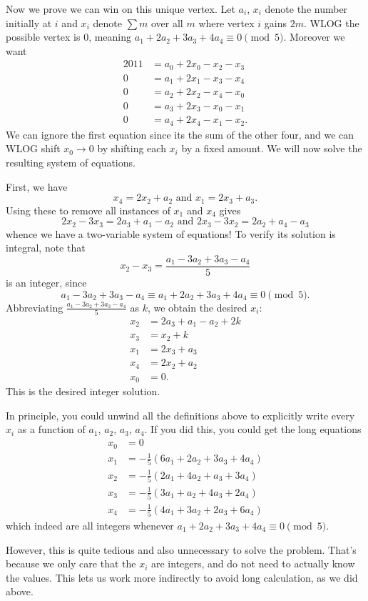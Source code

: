 \documentclass[11pt]{scrartcl}
\begin{document}
Now we prove we can win on this unique vertex.
Let $a_i$, $x_i$ denote the number initially at $i$
and $x_i$ denote $\sum m$ over all $m$ where vertex $i$ gains $2m$.
WLOG the possible vertex is $0$,
meaning $a_1 + 2a_2 + 3a_3 + 4a_4 \equiv 0 \pmod 5$.
Moreover we want
\begin{align*}
  2011 &= a_0 + 2x_0 - x_2 - x_3 \\
  0 &= a_1 + 2x_1 - x_3 - x_4 \\
  0 &= a_2 + 2x_2 - x_4 - x_0 \\
  0 &= a_3 + 2x_3 - x_0 - x_1 \\
  0 &= a_4 + 2x_4 - x_1 - x_2.
\end{align*}
We can ignore the first equation since its the sum of the other four,
and we can WLOG shift $x_0 \to 0$ by shifting each $x_i$ by a fixed amount.
We will now solve the resulting system of equations.

First, we have \[ x_4 = 2x_2 + a_2 \text{ and } x_1 = 2x_3 + a_3. \]
Using these to remove all instances of $x_1$ and $x_4$ gives
\[ 2x_2-3x_3 = 2a_3+a_1-a_2 \text{ and } 2x_3-3x_2 = 2a_2+a_4-a_3 \]
whence we have a two-variable system of equations!
To verify its solution is integral, note that
\[ x_2-x_3 = \frac{a_1 - 3a_2 + 3a_3 - a_4}{5} \]
is an integer, since
\[ a_1 - 3a_2 + 3a_3 - a_4 \equiv a_1 + 2a_2 + 3a_3 + 4a_4 \equiv 0 \pmod 5. \]
Abbreviating $\frac{a_1 - 3a_2 + 3a_3 - a_4}{5}$ as $k$, we obtain the desired $x_i$:
\begin{align*}
  x_2 &= 2a_3+a_1-a_2 + 2k \\
  x_3 &= x_2 + k \\
  x_1 &= 2x_3 + a_3 \\
  x_4 &= 2x_2 + a_2 \\
  x_0 &= 0.
\end{align*}
This is the desired integer solution.

\begin{remark*}
  In principle, you could unwind all the definitions above to explicitly
  write every $x_i$ as a function of $a_1$, $a_2$, $a_3$, $a_4$.
  If you did this, you could get the long equations
  \begin{align*}
    x_0 &= 0 \\
    x_1 &= -\tfrac15(6a_1 + 2a_2 + 3a_3 + 4a_4) \\
    x_2 &= -\tfrac15(2a_1 + 4a_2 + a_3 + 3a_4) \\
    x_3 &= -\tfrac15(3a_1 + a_2 + 4a_3 + 2a_4) \\
    x_4 &= -\tfrac15(4a_1 + 3a_2 + 2a_3 + 6a_4)
  \end{align*}
  which indeed are all integers whenever $a_1 + 2a_2 + 3a_3 + 4a_4 \equiv 0 \pmod 5$.

  However, this is quite tedious and also unnecessary to solve the problem.
  That's because we only care that the $x_i$ are integers,
  and do not need to actually know the values.
  This lets us work more indirectly to avoid long calculation, as we did above.
\end{remark*}
\pagebreak
\end{document}
